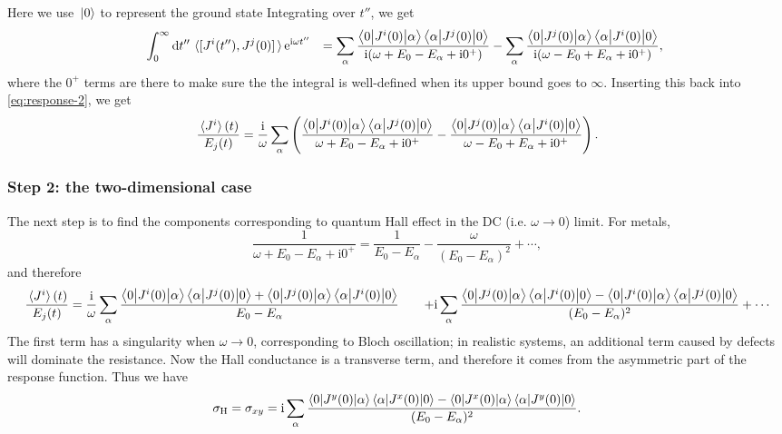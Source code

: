 \documentclass[hyperref, a4paper]{article}
\newcommand*{\ii}{\mathrm{i}}
\newcommand*{\ee}{\mathrm{e}}
\def\\{}%
\begin{document}
Here we use $\ket*{0}$ to represent the ground state 
Integrating over $t''$, we get 
\[
    \begin{aligned}
        &\quad \int_{0}^{\infty} \dd{t''} \expval*{\comm*{J^i(t'')}{J^j(0)}} \ee^{\ii \omega t''} \\
        &= \sum_\alpha \frac{\mel**{0}{J^i(0)}{\alpha} \mel**{\alpha}{J^j(0)}{0}}{\ii (\omega + E_0 - E_\alpha + \ii 0^+)}
        - \sum_\alpha \frac{\mel**{0}{J^j(0)}{\alpha} \mel**{\alpha}{J^i(0)}{0}}{\ii (\omega - E_0 + E_\alpha + \ii 0^+)},
    \end{aligned}
\]
where the $0^+$ terms are there to make sure 
the the integral is well-defined when its upper bound goes to $\infty$.
Inserting this back into \eqref{eq:response-2}, 
we get 
\begin{equation}
    \frac{\expval*{J^i}(t)}{E_j(t)} = \frac{\ii}{\omega} \sum_\alpha \left(
        \frac{\mel**{0}{J^i(0)}{\alpha} \mel**{\alpha}{J^j(0)}{0}}{ \omega + E_0 - E_\alpha + \ii 0^+}
        - \frac{\mel**{0}{J^j(0)}{\alpha} \mel**{\alpha}{J^i(0)}{0}}{\omega - E_0 + E_\alpha + \ii 0^+}
    \right).
\end{equation}

\subsubsection{Step 2: the two-dimensional case}

The next step is to find the components corresponding to quantum Hall effect 
in the DC (i.e. $\omega \to 0$) limit.
For metals, 
\[
    \frac{1}{\omega + E_0 - E_\alpha + \ii 0^+} = 
    \frac{1}{E_0 - E_\alpha} - \frac{\omega}{(E_0 - E_\alpha)^2} + \cdots,
\] 
and therefore 
\begin{equation}
    \begin{aligned}
        \frac{\expval*{J^i}(t)}{E_j(t)} &= 
        \frac{\ii}{\omega} \sum_\alpha
        \frac{
            \mel**{0}{J^i(0)}{\alpha} \mel**{\alpha}{J^j(0)}{0}
            + \mel**{0}{J^j(0)}{\alpha} \mel**{\alpha}{J^i(0)}{0}
        }{E_0 - E_\alpha} \\
        &\quad + \ii \sum_{\alpha}
        \frac{
            \mel**{0}{J^j(0)}{\alpha} \mel**{\alpha}{J^i(0)}{0}
            - \mel**{0}{J^i(0)}{\alpha} \mel**{\alpha}{J^j(0)}{0}
        }{(E_0 - E_\alpha)^2} + \cdots
    \end{aligned}
\end{equation}
The first term has a singularity when $\omega \to 0$,
corresponding to Bloch oscillation;
in realistic systems, 
an additional term caused by defects will dominate the resistance.
Now the Hall conductance is a transverse term,
and therefore it comes from the asymmetric part of the response function.
Thus we have 
\begin{equation}
    \sigma_{\text{H}} = \sigma_{xy} = \ii \sum_{\alpha}
    \frac{
        \mel**{0}{J^y(0)}{\alpha} \mel**{\alpha}{J^x(0)}{0}
        - \mel**{0}{J^x(0)}{\alpha} \mel**{\alpha}{J^y(0)}{0}
    }{(E_0 - E_\alpha)^2} .
    \label{eq:hall-conductance-intermediate-1}
\end{equation}
\end{document}
